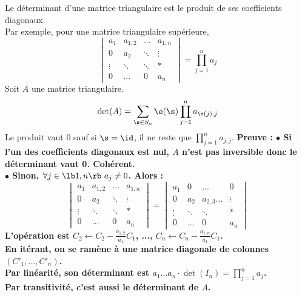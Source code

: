 \documentclass[11pt]{article}
\begin{document}
\begin{prop}{}{}
    Le déterminant d'une matrice triangulaire est le produit de ses coefficients diagonaux.\\
    Par exemple, pour une matrice triangulaire supérieure,
    \begin{equation*}
        \begin{vmatrix}
            a_{1} & a_{1,2} & ... & a_{1,n} \\
            0 & a_{2} & \ddots & \vdots \\
            \vdots & \ddots & \ddots & * \\
            0 & ... & 0 & a_{n}
        \end{vmatrix}=\prod_{j=1}^na_j
    \end{equation*}
    \tcblower
    Soit $A$ une matrice triangulaire.
    \begin{equation*}
        \det(A)=\sum_{\s\in S_n}\e(\s)\prod_{j=1}^na_{\s(j),j}
    \end{equation*}
    Le produit vaut $0$ sauf si $\s=\id$, il ne reste que $\prod_{j=1}^na_{j,j}$.\n
    \bf{Preuve :}\n
    $\bullet$ Si l'un des coefficients diagonaux est nul, $A$ n'est pas inversible donc le déterminant vaut 0. Cohérent.\\
    $\bullet$ Sinon, $\forall j \in \lb 1,n \rb ~ a_j \neq 0$. Alors :
    \begin{equation*}
        \begin{vmatrix}
            a_{1} & a_{1,2} & ... & a_{1,n} \\
            0 & a_{2} & \ddots & \vdots \\
            \vdots & \ddots & \ddots & * \\
            0 & ... & 0 & a_{n}
        \end{vmatrix}
        =
        \begin{vmatrix}
            a_{1} & 0 & ... & 0 \\
            0 & a_{2} & a_{2,3}\dots & \vdots \\
            \vdots & \ddots & \ddots & * \\
            0 & ... & 0 & a_{n}
        \end{vmatrix}
    \end{equation*}
    L'opération est $C_2 \gets C_2 - \frac{a_{1,2}}{a_1}C_1$, ..., $C_n \gets C_n - \frac{a_{1,n}}{a_1}C_1$.\\
    En itérant, on se ramène à une matrice diagonale de colonnes $(C'_1,...,C'_n)$.\\
    Par linéarité, son déterminant est $a_1...a_n\cdot \det(I_n)=\prod_{j=1}^na_j$.\\
    Par transitivité, c'est aussi le déterminant de $A$.

\end{prop}
\end{document}

